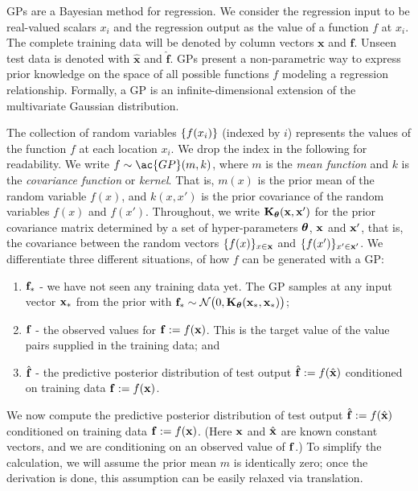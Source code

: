 \ac{GP}s are a Bayesian method for regression. We consider the regression input to be real-valued scalars $x_i$ and the regression output as the value of a function $f$ at $x_i$. The complete training data will be denoted by column vectors $\mathbf{x}$ and $\mathbf{f}$. Unseen test data is denoted with $\mathbf{\hat{x}}$ and $\mathbf{\hat{f}}$.
\ac{GP}s present a non-parametric way to express prior knowledge on the space of all possible functions $f$ modeling
a regression relationship.
Formally, a GP is an infinite-dimensional extension of the multivariate Gaussian distribution.

The collection of random variables $\left\{ f(x_i) \right\}$ (indexed by $i$) represents the
values of the function $f$ at each location $x_i$.
We drop the index in the following for readability.
We write $f \sim \ac{GP}(m,k)$, where $m$ is the {\em mean function} and $k$ is the {\em covariance function} or {\em kernel}.
That is, $m(x)$ is the prior mean of the random variable $f(x)$, and $k(x,x')$ is the prior covariance of the random variables $f(x)$ and $f(x')$.
Throughout, we write $\mathbf{K}_{\bm{\theta}}(\mathbf{x},\mathbf{x}^\prime)$ for the prior covariance
matrix determined by a set of hyper-parameters $\bm{\theta}$, $\mathbf{x}$ and $\mathbf{x}^\prime$, that is, the covariance between the random vectors $\{f(x)\}_{x \in \mathbf{x}}$ and $\{f(x')\}_{x' \in \mathbf{x}'}$.
We differentiate three different situations, of how  $f$ can be generated with a \ac{GP}:
\begin{enumerate}
\item $\mathbf{f}_*$ - we have not seen any training data yet.
    The \ac{GP} samples at any input vector $\mathbf{x}_*$ from the prior with
     $\mathbf{f}_* \sim \mathcal{N}\big(0,\mathbf{K}_{\bm{\theta}}(\mathbf{x}_*,\mathbf{x}_*)\big)$;
\item $\mathbf{f}$ - the observed values for $\mathbf{f}:=f(\mathbf{x})$. This is the target value of the value pairs supplied in 
the training data; and
\item $\hat{\mathbf{f}}$ - the predictive posterior distribution of test output $\hat{\mathbf{f}} := f(\hat{\mathbf{x}})$ conditioned on training data $\mathbf{f} := f(\mathbf{x})$.
\end{enumerate}We now compute the predictive posterior distribution of test output $\hat{\mathbf{f}} := f(\hat{\mathbf{x}})$ conditioned on training data $\mathbf{f} := f(\mathbf{x})$.  (Here $\mathbf{x}$ and $\hat{\mathbf{x}}$ are known constant vectors, and we are conditioning on an observed value of $\mathbf{f}$.)  To simplify the calculation, we will assume the prior mean $m$ is identically zero; once the derivation is done, this assumption can be easily relaxed via translation.

